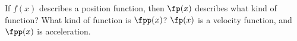 {If $f(x)$ describes a position function, then $\fp(x)$ describes what kind of function? What kind of function is $\fpp(x)$?
}
{$\fp(x)$ is a velocity function, and $\fpp(x)$ is acceleration.
}
